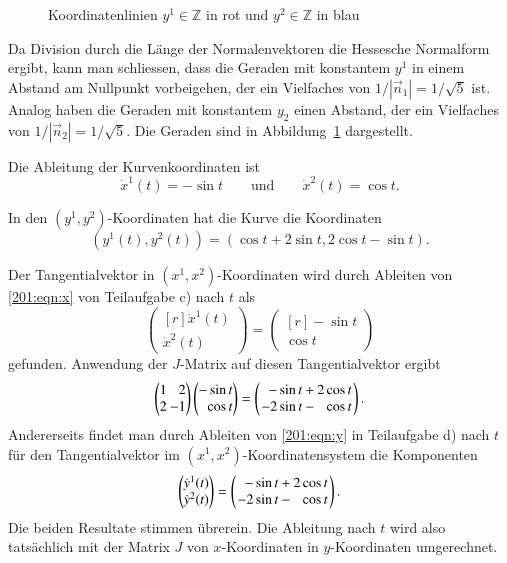 \begin{loesung}
\begin{teilaufgaben}
\begin{figure}
\caption{Koordinatenlinien $y^1\in\mathbb{Z}$ in rot und 
$y^2\in\mathbb{Z}$ in blau
\label{buch:201:fig}}
\end{figure}%
Da Division durch die Länge der Normalenvektoren die Hessesche
Normalform ergibt, kann man schliessen, dass die Geraden mit
konstantem $y^1$ in einem Abstand am Nullpunkt vorbeigehen, 
der ein Vielfaches von $1/|\vec{n}_1|=1/\sqrt{5}$ ist.
Analog haben die Geraden mit konstantem $y_2$ einen Abstand,
der ein Vielfaches von $1/|\vec{n}_2|=1/\sqrt{5}$.
Die Geraden sind in Abbildung~\ref{buch:201:fig} dargestellt.
\item
Die Ableitung der Kurvenkoordinaten ist
\begin{equation}
\dot{x}^1(t) = -\sin t
\qquad\text{und}\qquad
\dot{x}^2(t) = \cos t.
\label{201:eqn:x}
\end{equation}
\item
In den $(y^1,y^2)$-Koordinaten hat die Kurve die Koordinaten
\begin{equation}
(y^1(t), y^2(t))
=
(\cos t+2\sin t, 2\cos t - \sin t).
\label{201:eqn:y}
\end{equation}
\item
Der Tangentialvektor in $(x^1,x^2)$-Koordinaten wird durch
Ableiten von \eqref{201:eqn:x} von Teilaufgabe c) nach $t$
als
\[
\begin{pmatrix*}[r]
\dot{x}^1(t)\\
\dot{x}^2(t)
\end{pmatrix*}
=
\begin{pmatrix*}[r]
-\sin t\\
 \cos t
\end{pmatrix*}
\]
gefunden.
Anwendung der $J$-Matrix auf diesen Tangentialvektor ergibt
\[
\begin{pmatrix*}[r]
1 &  2 \\
2 & -1
\end{pmatrix*}
\begin{pmatrix*}[r]
-\sin t\\
 \cos t
\end{pmatrix*}
=
\left(
\renewcommand{\arraycolsep}{1.1pt}
\begin{array}{rcr}
 -\sin t &+& 2\cos t\\
-2\sin t &-&  \cos t
\end{array}
\right).
\]
Andererseits findet man durch Ableiten von \eqref{201:eqn:y} in Teilaufgabe d)
nach $t$ für
den Tangentialvektor im $(x^1,x^2)$-Koordinatensystem die
Komponenten
\[
\begin{pmatrix*}[r]
\dot{y}^1(t)\\
\dot{y}^2(t)
\end{pmatrix*}
=
\left(
\renewcommand{\arraycolsep}{1.1pt}
\begin{array}{rcr}
 -\sin t &+& 2\cos t\\
-2\sin t &-& \cos t
\end{array}
\right).
\]
Die beiden Resultate stimmen übrerein.
Die Ableitung nach $t$ wird also tatsächlich mit der Matrix $J$
von $x$-Koordinaten in $y$-Koordinaten umgerechnet.
\qedhere
\end{teilaufgaben}
\end{loesung}

